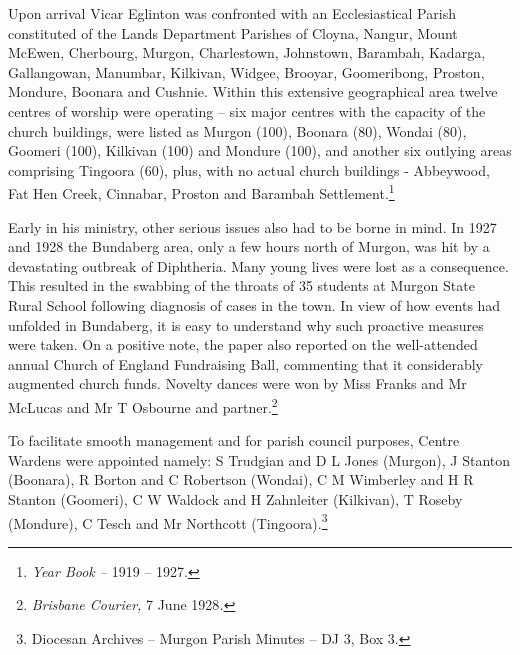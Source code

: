 Upon arrival Vicar Eglinton was confronted with an Ecclesiastical Parish constituted of the Lands Department Parishes of Cloyna, Nangur, Mount McEwen, Cherbourg, Murgon, Charlestown, Johnstown, Barambah, Kadarga, Gallangowan, Manumbar, Kilkivan, Widgee, Brooyar, Goomeribong, Proston, Mondure, Boonara and Cushnie. Within this extensive geographical area twelve centres of worship were operating -- six major centres with the capacity of the church buildings, were listed as Murgon (100), Boonara (80), Wondai (80), Goomeri (100), Kilkivan (100) and Mondure (100), and another six outlying areas comprising Tingoora (60), plus, with no actual church buildings - Abbeywood, Fat Hen Creek, Cinnabar, Proston and Barambah Settlement.\footnote{\emph{Year Book --} 1919 -- 1927.}


Early in his ministry, other serious issues also had to be borne in mind. In 1927 and 1928 the Bundaberg area, only a few hours north of Murgon, was hit by a devastating outbreak of Diphtheria. Many young lives were lost as a consequence. This resulted in the swabbing of the throats of 35 students at Murgon State Rural School following diagnosis of cases in the town. In view of how events had unfolded in Bundaberg, it is easy to understand why such proactive measures were taken. On a positive note, the paper also reported on the well-attended annual Church of England Fundraising Ball, commenting that it considerably augmented church funds. Novelty dances were won by Miss Franks and Mr McLucas and Mr T Osbourne and partner.\footnote{\emph{Brisbane Courier,} 7 June 1928\emph{.}}


To facilitate smooth management and for parish council purposes, Centre Wardens were appointed namely: S Trudgian and D L Jones (Murgon), J Stanton (Boonara), R Borton and C Robertson (Wondai), C M Wimberley and H R Stanton (Goomeri), C W Waldock and H Zahnleiter (Kilkivan), T Roseby (Mondure), C Tesch and Mr Northcott (Tingoora).\footnote{Diocesan Archives -- Murgon Parish Minutes -- DJ 3, Box 3.}


